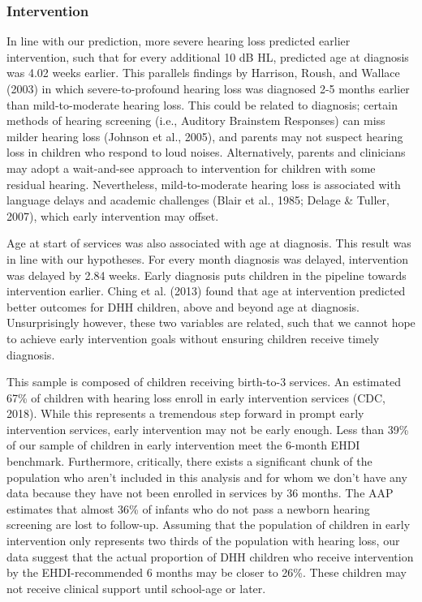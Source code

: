 \documentclass[
  english,
  man]{apa6}
\begin{document}
\hypertarget{intervention}{%
\subsubsection{Intervention}\label{intervention}}

In line with our prediction, more severe hearing loss predicted earlier intervention, such that for every additional 10 dB HL, predicted age at diagnosis was 4.02 weeks earlier. This parallels findings by Harrison, Roush, and Wallace (2003) in which severe-to-profound hearing loss was diagnosed 2-5 months earlier than mild-to-moderate hearing loss. This could be related to diagnosis; certain methods of hearing screening (i.e., Auditory Brainstem Responses) can miss milder hearing loss (Johnson et al., 2005), and parents may not suspect hearing loss in children who respond to loud noises. Alternatively, parents and clinicians may adopt a wait-and-see approach to intervention for children with some residual hearing. Nevertheless, mild-to-moderate hearing loss is associated with language delays and academic challenges (Blair et al., 1985; Delage \& Tuller, 2007), which early intervention may offset.

Age at start of services was also associated with age at diagnosis. This result was in line with our hypotheses. For every month diagnosis was delayed, intervention was delayed by 2.84 weeks. Early diagnosis puts children in the pipeline towards intervention earlier. Ching et al. (2013) found that age at intervention predicted better outcomes for DHH children, above and beyond age at diagnosis. Unsurprisingly however, these two variables are related, such that we cannot hope to achieve early intervention goals without ensuring children receive timely diagnosis.

This sample is composed of children receiving birth-to-3 services. An estimated 67\% of children with hearing loss enroll in early intervention services (CDC, 2018). While this represents a tremendous step forward in prompt early intervention services, early intervention may not be early enough. Less than 39\% of our sample of children in early intervention meet the 6-month EHDI benchmark. Furthermore, critically, there exists a significant chunk of the population who aren't included in this analysis and for whom we don't have any data because they have not been enrolled in services by 36 months. The AAP estimates that almost 36\% of infants who do not pass a newborn hearing screening are lost to follow-up. Assuming that the population of children in early intervention only represents two thirds of the population with hearing loss, our data suggest that the actual proportion of DHH children who receive intervention by the EHDI-recommended 6 months may be closer to 26\%. These children may not receive clinical support until school-age or later.
\end{document}
